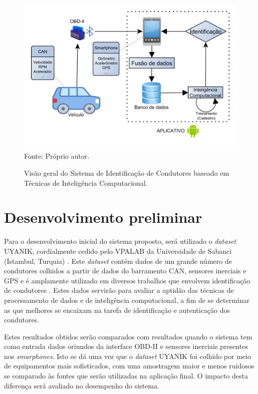 \begin{figure}[!htb]
\centering
\caption{Visão geral do Sistema de Identificação de Condutores baseado em Técnicas de Inteligência Computacional.} %
\includegraphics[scale=0.16]{FLUXOGRAMA.png}\\ 
{\small Fonte: Próprio autor.} %
\label{fig:flux} %
\end{figure}

\section{Desenvolvimento preliminar}

Para o desenvolvimento inicial do sistema proposto, será utilizado o \textit{dataset} UYANIK, cordialmente cedido pelo VPALAB da Universidade de Sabanci (Istambul, Turquia) \cite{Abut2007}. Este \textit{dataset} contém dados de um grande número de condutores colhidos a partir de dados do barramento CAN, sensores inerciais e GPS e é amplamente utilizado em diversos trabalhos que envolvem identificação de condutores \cite{Martinez2016a} \cite{jafarnejad2017} \cite{DelCampo2014}. Estes dados servirão para avaliar a aptidão das técnicas de processamento de dados e de inteligência computacional, a fim de se determinar as que melhores se encaixam na tarefa de identificação e autenticação dos condutores.

Estes resultados obtidos serão comparados com resultados quando o sistema tem como entrada dados oriundos da interface OBD-II e sensores inerciais presentes nos \textit{smarphones}. Isto se dá uma vez que o \textit{dataset} UYANIK foi colhido por meio de equipamentos mais sofisticados, com uma amostragem maior e menos ruidosos se comparado às fontes que serão utilizadas na aplicação final. O impacto desta diferença será avaliado no desempenho do sistema.

